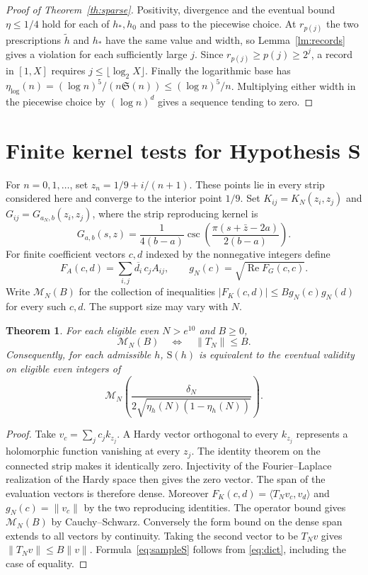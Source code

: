 \documentclass[11pt,a4paper]{article}
\newtheorem{theorem}{Theorem}[section]
\newcommand{\SSg}{\mathfrak S}
\DeclareMathOperator{\Rea}{Re}
\begin{document}
\begin{proof}[Proof of Theorem~\ref{th:sparse}]
Positivity, divergence and the eventual bound $\eta\le1/4$ hold for each of $h_*,h_0$ and pass to the piecewise choice. At $r_{p(j)}$ the two prescriptions $\widetilde h$ and $h_*$ have the same value and width, so Lemma~\ref{lm:records} gives a violation for each sufficiently large $j$. Since $r_{p(j)}\ge p(j)\ge2^j$, a record in $[1,X]$ requires $j\le\lfloor\log_2 X\rfloor$. Finally the logarithmic base has $\eta_{\log}(n)=(\log n)^5/(n\SSg(n))\le(\log n)^5/n$. Multiplying either width in the piecewise choice by $(\log n)^d$ gives a sequence tending to zero.
\end{proof}

\section{Finite kernel tests for Hypothesis S}\label{sec:samples}

For $n=0,1,\ldots$, set $z_n=1/9+i/(n+1)$. These points lie in every strip considered here and converge to the interior point $1/9$. Set $K_{ij}=K_N(z_i,z_j)$ and $G_{ij}=G_{a_N,b}(z_i,z_j)$, where the strip reproducing kernel is
\[
 G_{a,b}(s,z)=\frac{1}{4(b-a)}
     \csc\!\left(\frac{\pi(s+\bar z-2a)}{2(b-a)}\right).
\]
For finite coefficient vectors $c,d$ indexed by the nonnegative integers define
\[
 F_A(c,d)=\sum_{i,j}\overline{d_i}\,c_j A_{ij},
 \qquad g_N(c)=\sqrt{\Rea F_G(c,c)} .
\]
Write $\mathcal M_N(B)$ for the collection of inequalities
$|F_K(c,d)|\le B g_N(c)g_N(d)$ for every such $c,d$. The support size may vary with $N$.

\begin{theorem}\label{th:samples}
For each eligible even $N>e^{10}$ and $B\ge0$,
\[
 \mathcal M_N(B)\quad\Longleftrightarrow\quad \|T_N\|\le B .
\]
Consequently, for each admissible $h$, $\mathrm S(h)$ is equivalent to the eventual validity on eligible even integers of
\begin{equation}\label{eq:sampleS}
 \mathcal M_N\!\left(\frac{\delta_N}{2\sqrt{\eta_h(N)(1-\eta_h(N))}}\right).
\end{equation}
\end{theorem}
\begin{proof}
Take $v_c=\sum_j c_j k_{z_j}$. A Hardy vector orthogonal to every $k_{z_j}$ represents a holomorphic function vanishing at every $z_j$. The identity theorem on the connected strip makes it identically zero. Injectivity of the Fourier--Laplace realization of the Hardy space then gives the zero vector. The span of the evaluation vectors is therefore dense. Moreover
$F_K(c,d)=\langle T_Nv_c,v_d\rangle$ and $g_N(c)=\|v_c\|$ by the two reproducing identities. The operator bound gives $\mathcal M_N(B)$ by Cauchy--Schwarz. Conversely the form bound on the dense span extends to all vectors by continuity. Taking the second vector to be $T_Nv$ gives $\|T_Nv\|\le B\|v\|$. Formula~\eqref{eq:sampleS} follows from \eqref{eq:dict}, including the case of equality.
\end{proof}
\end{document}
